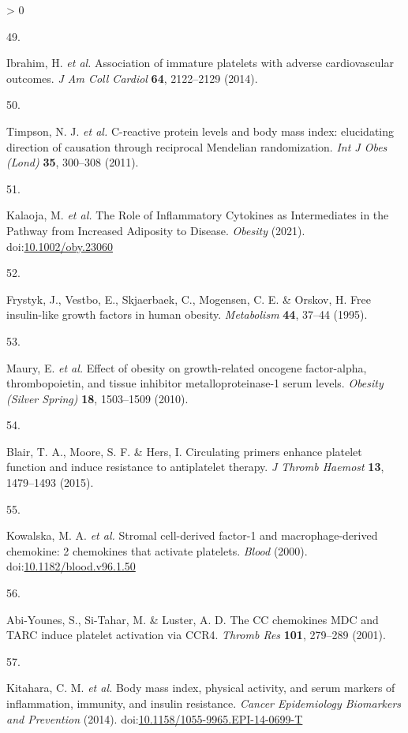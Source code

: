 \documentclass[11pt,twoside]{bristolthesis}
\newlength{\cslhangindent}
\newlength{\csllabelwidth}
\newenvironment{CSLReferences}[2] %
 {%
  \setlength{\parindent}{0pt}
  \ifodd #1 \everypar{\setlength{\hangindent}{\cslhangindent}}\ignorespaces\fi
  \ifnum #2 > 0
  \setlength{\parskip}{#2\baselineskip}
  \fi
 }%
 {}
\newcommand{\CSLLeftMargin}[1]{\parbox[t]{\csllabelwidth}{#1}}
\newcommand{\CSLRightInline}[1]{\parbox[t]{\linewidth - \csllabelwidth}{#1}\break}
\begin{document}
\begin{CSLReferences}{0}{0}
\leavevmode\hypertarget{ref-Ibrahim2014}{}%
\CSLLeftMargin{49. }
\CSLRightInline{Ibrahim, H. \emph{et al.} {Association of immature platelets with adverse cardiovascular outcomes}. \emph{J Am Coll Cardiol} \textbf{64}, 2122--2129 (2014).}

\leavevmode\hypertarget{ref-Timpson2011}{}%
\CSLLeftMargin{50. }
\CSLRightInline{Timpson, N. J. \emph{et al.} {C-reactive protein levels and body mass index: elucidating direction of causation through reciprocal Mendelian randomization}. \emph{Int J Obes (Lond)} \textbf{35}, 300--308 (2011).}

\leavevmode\hypertarget{ref-Kalaoja2021}{}%
\CSLLeftMargin{51. }
\CSLRightInline{Kalaoja, M. \emph{et al.} {The Role of Inflammatory Cytokines as Intermediates in the Pathway from Increased Adiposity to Disease}. \emph{Obesity} (2021). doi:\href{https://doi.org/10.1002/oby.23060}{10.1002/oby.23060}}

\leavevmode\hypertarget{ref-Frystyk1995}{}%
\CSLLeftMargin{52. }
\CSLRightInline{Frystyk, J., Vestbo, E., Skjaerbaek, C., Mogensen, C. E. \& Orskov, H. {Free insulin-like growth factors in human obesity}. \emph{Metabolism} \textbf{44}, 37--44 (1995).}

\leavevmode\hypertarget{ref-Maury2010a}{}%
\CSLLeftMargin{53. }
\CSLRightInline{Maury, E. \emph{et al.} {Effect of obesity on growth-related oncogene factor-alpha, thrombopoietin, and tissue inhibitor metalloproteinase-1 serum levels}. \emph{Obesity (Silver Spring)} \textbf{18}, 1503--1509 (2010).}

\leavevmode\hypertarget{ref-Blair2015}{}%
\CSLLeftMargin{54. }
\CSLRightInline{Blair, T. A., Moore, S. F. \& Hers, I. {Circulating primers enhance platelet function and induce resistance to antiplatelet therapy}. \emph{J Thromb Haemost} \textbf{13}, 1479--1493 (2015).}

\leavevmode\hypertarget{ref-Kowalska2000}{}%
\CSLLeftMargin{55. }
\CSLRightInline{Kowalska, M. A. \emph{et al.} {Stromal cell-derived factor-1 and macrophage-derived chemokine: 2 chemokines that activate platelets}. \emph{Blood} (2000). doi:\href{https://doi.org/10.1182/blood.v96.1.50}{10.1182/blood.v96.1.50}}

\leavevmode\hypertarget{ref-Abi-Younes2001}{}%
\CSLLeftMargin{56. }
\CSLRightInline{Abi-Younes, S., Si-Tahar, M. \& Luster, A. D. {The CC chemokines MDC and TARC induce platelet activation via CCR4}. \emph{Thromb Res} \textbf{101}, 279--289 (2001).}

\leavevmode\hypertarget{ref-Kitahara2014}{}%
\CSLLeftMargin{57. }
\CSLRightInline{Kitahara, C. M. \emph{et al.} {Body mass index, physical activity, and serum markers of inflammation, immunity, and insulin resistance}. \emph{Cancer Epidemiology Biomarkers and Prevention} (2014). doi:\href{https://doi.org/10.1158/1055-9965.EPI-14-0699-T}{10.1158/1055-9965.EPI-14-0699-T}}


\end{CSLReferences}
\end{document}
